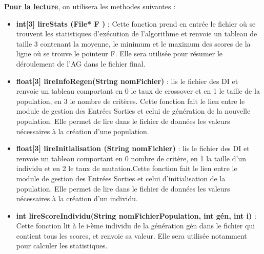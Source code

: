 \documentclass[a4paper,11pt]{article}
\begin{document}
			\underline{\bf Pour la lecture}, on utilisera les methodes suivantes :\\
			\begin{itemize}
				\item \textbf{int[3] lireStats (File* F )} : Cette fonction prend en entrée le fichier où se trouvent les statistiques d’exécution de l’algorithme et renvoie un tableau de taille 3 contenant la moyenne, le minimum et le maximum des scores de la ligne où se trouve le pointeur F. Elle sera utilisée pour résumer le déroulement de l'AG dans le fichier final.\vspace{0.2cm}
				\item \textbf{float[3] lireInfoRegen(String nomFichier)} : lis le fichier des DI et renvoie un tableau comportant en 0 le taux de crossover et en 1 le taille de la population, en 3 le nombre de critères.
					Cette fonction fait le lien entre le module de gestion des Entrées Sorties et celui de génération de la nouvelle population.
					Elle permet de lire dans le fichier de données les valeurs nécessaires à la création d’une population.\vspace{0.2cm}
				\item \textbf{float[3] lireInitialisation (String nomFichier)} : lis le fichier des DI et renvoie un tableau comportant en 0 nombre de critère, en 1 la taille d’un individu et en 2 le taux de mutation.Cette fonction fait le lien entre le module de gestion des Entrées Sorties et celui d’initialisation de la population. 
					Elle permet de lire dans le fichier de données les valeurs nécessaires à la création d’un individu.\vspace{0.2cm}

				\item \textbf{int lireScoreIndividu(String nomFichierPopulation, int gén, int i)} : Cette fonction lit à le i-ème individu de la génération gén dans le fichier qui contient tous les scores, et renvoie sa valeur. Elle sera utilisée notamment pour calculer les statistiques.\\

			\end{itemize}
			
\end{document}
